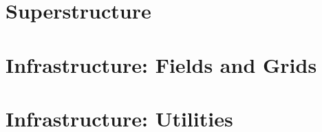 \documentclass[]{article}
\begin{document}





\newpage
\begin{htmlonly}
\end{htmlonly}
\part{Superstructure}
\label{part:Superstructure}




\newpage
\begin{htmlonly}
\end{htmlonly}
\part{Infrastructure:  Fields and Grids}
\label{part:Infrastructure_Fields_and_Grids}



\newpage
\begin{htmlonly}
\end{htmlonly}
\part{Infrastructure:  Utilities}
\label{part:Infrastructure_Utilities}
\end{document}
